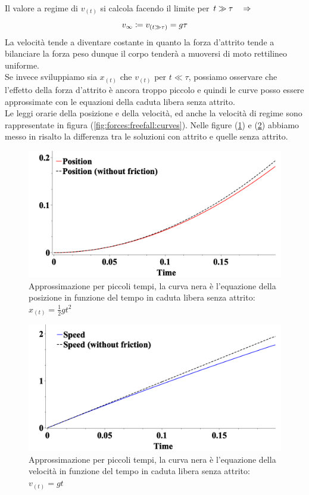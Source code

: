 \\
Il valore a regime di $v_{(t)}$ si calcola facendo il limite per
$t\gg\tau\quad\Rightarrow\quad$
\begin{equation}
    v_\infty\coloneqq v_{\left( t\gg\tau \right)} = g\tau
\label{eq:forces:viscous_vlim}
\end{equation}
La velocità tende a diventare costante in quanto la forza d'attrito tende a
bilanciare la forza peso dunque il corpo tenderà a muoversi di moto
rettilineo uniforme.\\
Se invece sviluppiamo sia $x_{(t)}$ che $v_{(t)}$ per $t\ll\tau$,
possiamo osservare che l'effetto della forza d'attrito è ancora troppo
piccolo e quindi le curve posso essere approssimate con le equazioni della
caduta libera senza attrito.\\
Le leggi orarie della posizione e della velocità, ed anche la velocità di regime
sono rappresentate in figura (\ref{fig:forces:freefall:curves}). Nelle figure
(\ref{fig:freefall_approx_x}) e (\ref{fig:freefall_approx_v})
abbiamo messo in risalto la differenza tra le soluzioni con attrito e quelle
senza attrito.

\begin{figure}[htbp]
    \center
    \includegraphics[width=13cm]{images/freefallX.png}
    \caption{Approssimazione per piccoli tempi, la curva nera è l'equazione
    della posizione in funzione del tempo in caduta libera senza attrito:
    $x_{(t)} = \frac12gt^2$}
\label{fig:freefall_approx_x}
\end{figure}

\begin{figure}[htbp]
\center
    \includegraphics[width=13cm]{images/freefallV.png}
    \caption{Approssimazione per piccoli tempi, la curva nera è l'equazione
    della velocità in funzione del tempo in caduta libera senza attrito:
    $v_{(t)} = gt$}
\label{fig:freefall_approx_v}
\end{figure}

